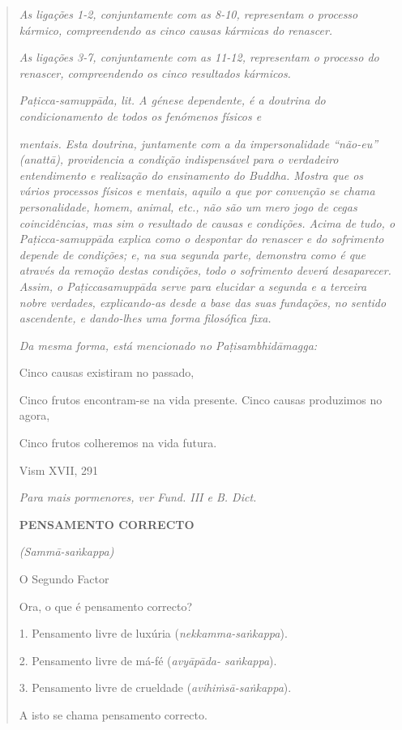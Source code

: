 \begin{quote}
\emph{As ligações 1-2, conjuntamente com as 8-10, representam o processo kármico, compreendendo as cinco causas kármicas do renascer.}

\emph{As ligações 3-7, conjuntamente com as 11-12, representam o processo do renascer, compreendendo os cinco resultados kármicos.}

\emph{Paṭicca-samuppāda, lit. A génese dependente, é a doutrina do condicionamento de todos os fenómenos físicos e}

\emph{mentais. Esta doutrina, juntamente com a da impersonalidade ``não-eu'' (anattā), providencia a condição indispensável para o verdadeiro entendimento e realização do ensinamento do Buddha. Mostra que os vários processos físicos e mentais, aquilo a que por convenção se chama personalidade, homem, animal, etc., não são um mero jogo de cegas coincidências, mas sim o resultado de causas e condições. Acima de tudo, o Paṭicca-samuppāda explica como o despontar do renascer e do sofrimento depende de condições; e, na sua segunda parte, demonstra como é que através da remoção destas condições, todo o sofrimento deverá desaparecer. Assim, o Paṭiccasamuppāda serve para elucidar a segunda e a terceira nobre verdades, explicando-as desde a base das suas fundações, no sentido ascendente, e dando-lhes uma forma filosófica fixa.}

\emph{Da mesma forma, está mencionado no Paṭisambhidāmagga:}

Cinco causas existiram no passado,

Cinco frutos encontram-se na vida presente. Cinco causas produzimos no agora,

Cinco frutos colheremos na vida futura.

Vism XVII, 291

\emph{Para mais pormenores, ver Fund. III e B. Dict.}

\textbf{PENSAMENTO CORRECTO}

\emph{(Sammā-saṅkappa)}

O Segundo Factor

Ora, o que é pensamento correcto?

1. Pensamento livre de luxúria (\emph{nekkamma-saṅkappa}).

2. Pensamento livre de má-fé (\emph{avyāpāda- saṅkappa}).

3. Pensamento livre de crueldade (\emph{avihiṁsā-saṅkappa}).

A isto se chama pensamento correcto.


\end{quote}

